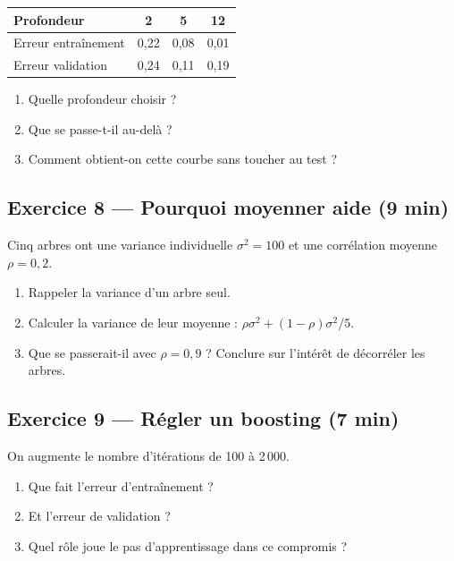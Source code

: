 \begin{center}
\small
\begin{tabular}{@{}lccc@{}}
\toprule
\textbf{Profondeur} & 2 & 5 & 12 \\
\midrule
Erreur entraînement & 0,22 & 0,08 & 0,01 \\
Erreur validation & 0,24 & 0,11 & 0,19 \\
\bottomrule
\end{tabular}
\end{center}

\begin{enumerate}
  \item Quelle profondeur choisir ?
  \item Que se passe-t-il au-delà ?
  \item Comment obtient-on cette courbe sans toucher au test ?
\end{enumerate}

\subsection*{Exercice 8 --- Pourquoi moyenner aide \hfill \normalfont\footnotesize (9 min)}
Cinq arbres ont une variance individuelle $\sigma^2=100$ et une corrélation
moyenne $\rho=0{,}2$.
\begin{enumerate}
  \item Rappeler la variance d'un arbre seul.
  \item Calculer la variance de leur moyenne :
        $\rho\sigma^2+(1-\rho)\sigma^2/5$.
  \item Que se passerait-il avec $\rho=0{,}9$ ? Conclure sur l'intérêt de
        décorréler les arbres.
\end{enumerate}

\subsection*{Exercice 9 --- Régler un boosting \hfill \normalfont\footnotesize (7 min)}
On augmente le nombre d'itérations de 100 à 2\,000.
\begin{enumerate}
  \item Que fait l'erreur d'entraînement ?
  \item Et l'erreur de validation ?
  \item Quel rôle joue le pas d'apprentissage dans ce compromis ?
\end{enumerate}

\newpage

